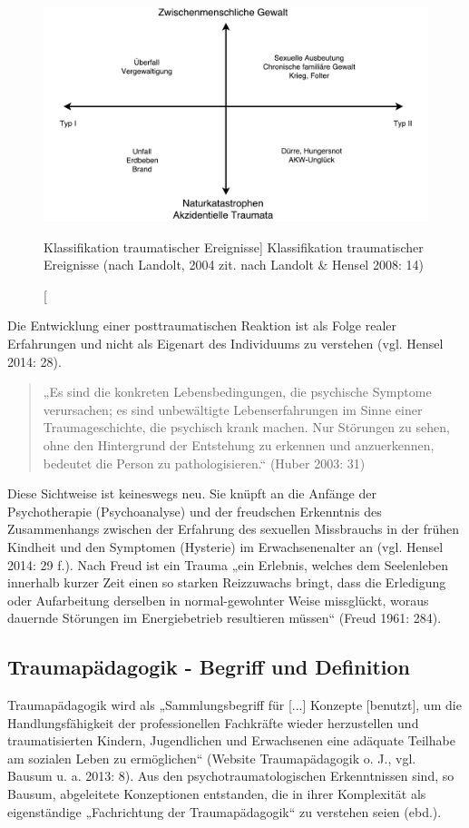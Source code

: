\begin{figure}[h]
  \centering
  \includegraphics[scale=0.5]{abbildung1}
  \caption
      [Klassifikation traumatischer Ereignisse]
      {Klassifikation traumatischer Ereignisse (nach Landolt, 2004 zit. nach Landolt \& Hensel 2008: 14)}
\end{figure}

Die Entwicklung einer posttraumatischen Reaktion ist als Folge realer Erfahrungen und nicht als Eigenart des Individuums zu verstehen (vgl. Hensel 2014: 28).

\begin{quote}
\small{„Es sind die konkreten Lebensbedingungen, die psychische Symptome verursachen; es sind unbewältigte Lebenserfahrungen im Sinne einer Traumageschichte, die psychisch krank machen. Nur Störungen zu sehen, ohne den Hintergrund der Entstehung zu erkennen und anzuerkennen, bedeutet die Person zu pathologisieren.“ (Huber 2003: 31)}
\end{quote}

Diese Sichtweise ist keineswegs neu. Sie knüpft an die Anfänge der Psychotherapie (Psychoanalyse) und der freudschen Erkenntnis des Zusammenhangs zwischen der Erfahrung des sexuellen Missbrauchs in der frühen Kindheit und den Symptomen (Hysterie) im Erwachsenenalter an (vgl. Hensel 2014: 29 f.). Nach Freud ist ein Trauma „ein Erlebnis, welches dem Seelenleben innerhalb kurzer Zeit einen so starken Reizzuwachs bringt, dass die Erledigung oder Aufarbeitung derselben in normal-gewohnter Weise missglückt, woraus dauernde Störungen im Energiebetrieb resultieren müssen“ (Freud 1961: 284). 

\subsection{Traumapädagogik - Begriff und Definition}
Traumapädagogik wird als „Sammlungsbegriff für [...] Konzepte [benutzt], um die Handlungsfähigkeit der professionellen Fachkräfte wieder herzustellen und traumatisierten Kindern, Jugendlichen und Erwachsenen eine adäquate Teilhabe am sozialen Leben zu ermöglichen“ (Website Traumapädagogik o. J., vgl. Bausum u. a. 2013: 8). Aus den psychotraumatologischen Erkenntnissen sind, so Bausum, abgeleitete Konzeptionen entstanden, die in ihrer Komplexität als eigenständige „Fachrichtung der Traumapädagogik“ zu verstehen seien (ebd.).  

